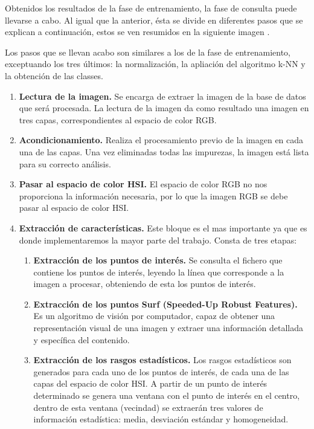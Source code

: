 Obtenidos los resultados de la fase de entrenamiento, la fase de consulta puede llevarse a cabo. Al igual que la anterior, \'esta se divide en diferentes pasos que se explican a continuación, estos se ven resumidos en la siguiente imagen .


Los pasos que se llevan acabo son similares a los de la fase de entrenamiento, exceptuando los tres \'ultimos: la normalización, la apliaci\'on del algoritmo k-NN y la obtenci\'on de las classes.

\begin{enumerate}
	\item \textbf{Lectura de la imagen.} Se encarga de extraer la imagen de la base de datos que ser\'a procesada. La lectura de la imagen da como resultado una imagen en tres capas, correspondientes al espacio de color RGB.
	\item \textbf{Acondicionamiento.} Realiza el procesamiento previo de la imagen en cada una de las capas. Una vez eliminadas todas las impurezas, la imagen est\'a lista para su correcto an\'alisis.
	\item \textbf{Pasar al espacio de color HSI.} El espacio de color RGB no nos proporciona la informaci\'on necesaria, por lo que la imagen RGB se debe pasar al espacio de color HSI.
	\item \textbf{Extracci\'on de caracter\'isticas.} Este bloque es el mas importante ya que es donde implementaremos la mayor parte del trabajo. Consta de tres etapas:
		\begin{enumerate}
		\item \textbf{Extracci\'on de los puntos de inter\'es.} Se consulta el fichero que contiene los puntos de inter\'es, leyendo la l\'inea que corresponde a la imagen a procesar, obteniendo de esta los puntos de inter\'es.
		\item \textbf{Extracci\'on de los puntos Surf (Speeded-Up Robust Features).} Es un algoritmo de visi\'on por computador, capaz de obtener una representaci\'on visual de una imagen y extraer una informaci\'on detallada y espec\'ifica del contenido. 
		\item \textbf{Extracci\'on de los rasgos estad\'isticos.} Los rasgos estad\'isticos son generados para cada uno de los puntos de inter\'es, de cada una de las capas del espacio de color HSI. A partir de un punto de inter\'es determinado se genera una ventana con el punto de inter\'es en el centro, dentro de esta ventana (vecindad) se extraer\'an tres valores de informaci\'on estad\'istica: media, desviaci\'on est\'andar y homogeneidad.

\end{enumerate}
\end{enumerate}
